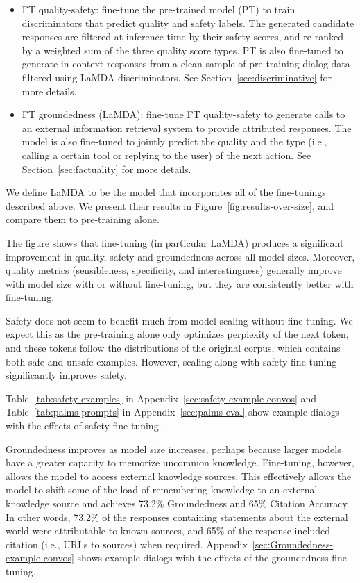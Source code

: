 \begin{itemize}
\item FT quality-safety: fine-tune the pre-trained model (PT) to train discriminators that predict quality and safety labels. The generated candidate responses are filtered at inference time by their safety scores, and re-ranked by a weighted sum of the three quality score types. PT is also fine-tuned to generate in-context responses from a clean sample of pre-training dialog data filtered using LaMDA discriminators. See Section~\ref{sec:discriminative} for more details.
\item FT groundedness (LaMDA): fine-tune FT quality-safety to generate calls to an external information retrieval system to provide attributed responses. The model is also fine-tuned to jointly predict the quality and the type (i.e., calling a certain tool or replying to the user) of the next action. See Section~\ref{sec:factuality} for more details.
\end{itemize}

We define LaMDA to be the model that incorporates all of the fine-tunings described above. We present their results in Figure~\ref{fig:results-over-size}, and compare them to pre-training alone.

The figure shows that fine-tuning (in particular LaMDA) produces a significant improvement in quality, safety and groundedness across all model sizes. Moreover, quality metrics (sensibleness, specificity, and interestingness) generally improve with model size with or without fine-tuning, but they are consistently better with fine-tuning.

Safety does not seem to benefit much from model scaling without fine-tuning. We expect this as the pre-training alone only optimizes perplexity of the next token, and these tokens follow the distributions of the original corpus, which contains both safe and unsafe examples. However, scaling along with safety fine-tuning significantly improves safety.

Table~\ref{tab:safety-examples} in Appendix~\ref{sec:safety-example-convos} and Table~\ref{tab:palms-prompts} in Appendix~\ref{sec:palms-eval} show example dialogs with the effects of safety-fine-tuning.

Groundedness improves as model size increases, perhaps because larger models have a greater capacity to memorize uncommon knowledge. Fine-tuning, however, allows the model to access external knowledge sources. This effectively allows the model to shift some of the load of remembering knowledge to an external knowledge source and achieves 73.2\% Groundedness and 65\% Citation Accuracy. In other words, 73.2\% of the responses containing statements about the external world were attributable to known sources, and 65\% of the response included citation (i.e., URLs to sources) when required.  Appendix~\ref{sec:Groundedness-example-convos} shows example dialogs with the effects of the groundedness fine-tuning.

